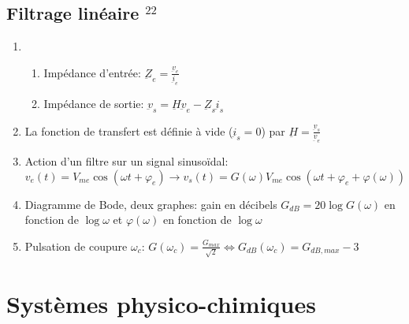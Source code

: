 \documentclass[fleqn]{article}
\theoremstyle{definition} \newtheorem*{defi}{D\'efinition}
\theoremstyle{definition} \newtheorem*{theo}{Th\'eor\`eme}
\theoremstyle{definition} \newtheorem*{coro}{Corollaire}
\theoremstyle{remark} \newtheorem*{rqs}{Remarques}
\theoremstyle{definition} \newtheorem*{prop}{Propri\'et\'e}
\begin{document}
\subsection{Filtrage lin\'eaire $^{22}$}
\begin{enumerate}
	\item \begin{enumerate} \item Imp\'edance d'entr\'ee: $\underbar{Z}_e = \frac{\underbar{v}_e}{\underbar{i}_e}$
		\item Imp\'edance de sortie: $\underbar{v}_s = \underbar{H}\underbar{v}_e  - \underbar{Z}_s \underbar{i}_s$ \end{enumerate}
	\item La fonction de transfert est d\'efinie \`a vide ($\underbar{i}_s = 0$) par $\underbar{H} = \frac{\underbar{v}_s}{\underbar{v}_e}$
	\item Action d'un filtre sur un signal sinuso\"idal: \\
		$v_e(t) = V_{me} \cos(\omega t + \varphi_e) \rightarrow v_s(t) = G(\omega) V_{me} \cos (\omega t + \varphi_e + \varphi(\omega))$
	\item Diagramme de Bode, deux graphes: gain en d\'ecibels $G_{dB} = 20 \log G(\omega)$ en fonction de $\log \omega$ et $\varphi(\omega)$ en
		fonction de $\log \omega$
	\item Pulsation de coupure $\omega_c$: $G(\omega_c) = \frac{G_{max}}{\sqrt{2}} \Leftrightarrow G_{dB}(\omega_c) = G_{dB,max} -3$
\end{enumerate}


\newpage

\section{Syst\`emes physico-chimiques}
\end{document}

